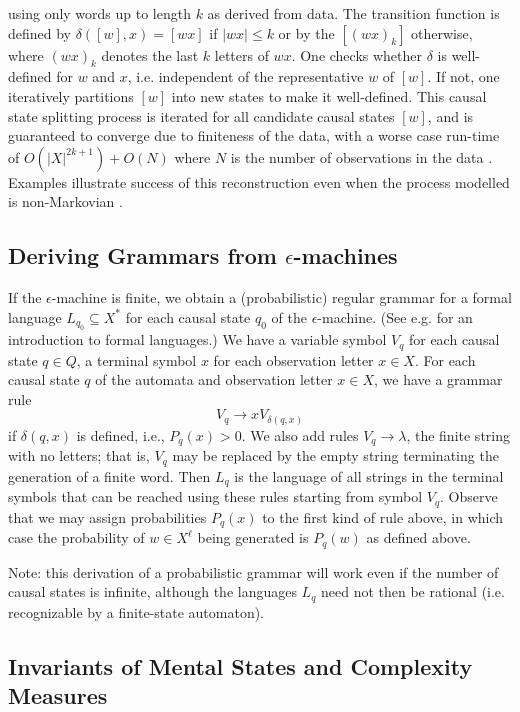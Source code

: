 \documentclass[journal]{IEEEtran}
\begin{document}
 using only words up to length $k$ as derived from data.   The transition function is defined by $\delta([w],x)=[wx]$ if $|wx|\leq k$ or by the $[(wx)_k]$ otherwise, where $(wx)_k$ denotes the last $k$ letters of $wx$.   One checks whether $\delta$ is well-defined for $w$ and $x$, i.e. independent of the representative $w$ of $[w]$. If not, one iteratively partitions  $[w]$ into new states to make it well-defined.  This causal state splitting process is iterated for all candidate causal states $[w]$, and is guaranteed to converge due to finiteness of the data, with a worse case run-time of $O(|X|^{2k+1})+O(N)$ where $N$ is the number of observations in the data \cite{Shalizi2003}.
 Examples illustrate success of this reconstruction even when the process modelled is non-Markovian \cite{Shalizi2003}. 

 
   \subsection{Deriving Grammars from $\epsilon$-machines}
If the $\epsilon$-machine is finite, we obtain a
(probabilistic) regular grammar for a formal language $L_{q_0} \subseteq X^*$ for each causal state $q_0$ of the $\epsilon$-machine. 
  (See e.g. %
 \cite{Hopcroft}
 for an introduction to formal languages.) 
We have a variable symbol $V_q$ for each causal state $q \in Q$, a terminal symbol $x$ for each observation letter $x\in X$. 
For each causal state $q$ of the automata and observation letter $x\in X$, we have a  grammar rule 
$$V_q \rightarrow x V_{\delta(q,x)} $$
 if $\delta(q,x)$ is defined, i.e.,  $P_q(x)>0.$
We also add rules 
$V_q \rightarrow  \lambda$, the finite string with no letters; that is, $V_q$ may be replaced by the empty string terminating the generation of a finite word.
 Then $L_q$ is the language of all strings in the terminal symbols that can be reached using these rules starting from symbol $V_q$.  Observe that we may assign
 probabilities $P_q(x)$ to the first kind of rule above, in which case the probability of $w \in X^{\ell}$ being generated is $P_q(w)$ as defined above.

  Note: this derivation of a probabilistic grammar will work even if the number of 
 causal states is infinite, although the languages $L_q$ need not then be rational (i.e. recognizable by a finite-state automaton). 
 \subsection{Invariants of Mental States and Complexity Measures}
 
\end{document}
